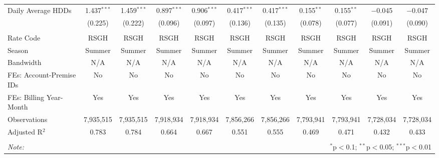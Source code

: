\begin{table}[!htbp]
\begin{adjustbox}{scale = 0.75}
\begin{tabular}{@{\extracolsep{5pt}}lcccccccccc}
 Daily Average HDDs & 1.437$^{***}$ & 1.459$^{***}$ & 0.897$^{***}$ & 0.906$^{***}$ & 0.417$^{***}$ & 0.417$^{***}$ & 0.155$^{**}$ & 0.155$^{**}$ & $-$0.045 & $-$0.047 \\ 
  & (0.225) & (0.222) & (0.096) & (0.097) & (0.136) & (0.135) & (0.078) & (0.077) & (0.091) & (0.090) \\ 
\hline \\[-1.8ex] 
Rate Code & RSGH & RSGH & RSGH & RSGH & RSGH & RSGH & RSGH & RSGH & RSGH & RSGH \\ 
Season & Summer & Summer & Summer & Summer & Summer & Summer & Summer & Summer & Summer & Summer \\ 
Bandwidth & N/A & N/A & N/A & N/A & N/A & N/A & N/A & N/A & N/A & N/A \\ 
FEs: Account-Premise IDs & No & No & No & No & No & No & No & No & No & No \\ 
FEs: Billing Year-Month & Yes & Yes & Yes & Yes & Yes & Yes & Yes & Yes & Yes & Yes \\ 
Observations & 7,935,515 & 7,935,515 & 7,918,934 & 7,918,934 & 7,856,266 & 7,856,266 & 7,793,941 & 7,793,941 & 7,728,034 & 7,728,034 \\ 
Adjusted R$^{2}$ & 0.783 & 0.784 & 0.664 & 0.667 & 0.551 & 0.555 & 0.469 & 0.471 & 0.432 & 0.433 \\ 
\hline 
\hline \\[-1.8ex] 
\textit{Note:}  & \multicolumn{10}{r}{$^{*}$p$<$0.1; $^{**}$p$<$0.05; $^{***}$p$<$0.01} \\ 
\end{tabular}
\end{adjustbox}
\end{table} 
